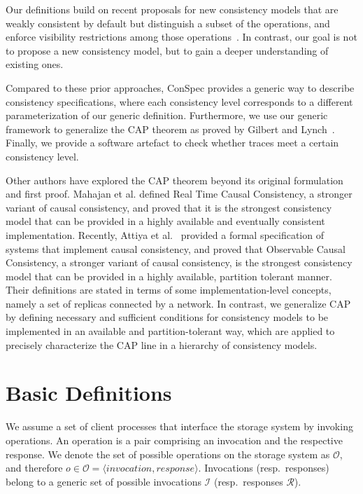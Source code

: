 \documentclass[journal,compsoc]{IEEEtran}
\begin{document}
Our definitions build on recent proposals for new consistency models that are weakly consistent by default but distinguish a subset of the operations, and enforce visibility restrictions among those operations~\cite{Li:2012:MGS:2387880.2387906, Gotsman:2016:CIS:2837614.2837625, cheng-papoc}. In contrast, our goal is not to propose a new consistency model, but to gain a deeper understanding of existing ones.

Compared to these prior approaches, ConSpec provides a generic way to describe consistency specifications, where each consistency level corresponds to a different parameterization of our generic definition. Furthermore, we use our generic framework to generalize the CAP theorem as proved by Gilbert and Lynch~\cite{Gilbert:2002:BCF:564585.564601}. Finally, we provide a software artefact to check whether traces meet a certain consistency level.


Other authors have explored the CAP theorem beyond its original formulation and first proof. 
Mahajan et al. \cite{mahajan11cacTR} defined Real Time Causal Consistency, a stronger variant of causal consistency, and proved that it is the strongest consistency model that can be provided in a highly available and eventually consistent implementation.  
Recently, Attiya et al.~\cite{Attiya:2015:LHE:2767386.2767419}  provided a formal specification of systems that implement causal consistency, and proved that Observable Causal Consistency, a stronger variant of causal consistency, is the strongest consistency model that can be provided in a highly available, partition tolerant manner. Their definitions are stated in terms of some implementation-level concepts, namely a set of replicas connected by a network.
In contrast, we generalize CAP by defining necessary and sufficient conditions for consistency models to be implemented in an available and partition-tolerant way, which are applied to precisely characterize the CAP line in a hierarchy of consistency models.

  \section{Basic Definitions} \label{sec:definitions}



We assume a set of client processes that interface the storage system by invoking operations. An operation is a pair comprising an invocation and the respective response. We denote the set of possible operations on the storage system as $\mathcal{O}$, and therefore $o \in \mathcal{O} = \langle \textit{invocation},\textit{response}\rangle$. Invocations (resp.\ responses) belong to a generic set of possible invocations $\mathcal{I}$ (resp.\ responses $\mathcal{R}$).
\end{document}
